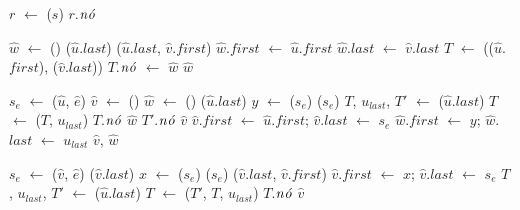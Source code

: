 \begin{algorithm}[htb]
\caption{\LCOFindNode($s$)}
\label{Algo:LCOFindNode}
\begin{algorithmic}[1]
\State $r$ $\gets$ \treapGetRoot($s$)
\State \Return $r$.$\mathit{n\acute{o}}$
\end{algorithmic}
\end{algorithm}


\begin{algorithm}[htb]
\caption{\LCOMerge($\hat u$, $\hat v$)}
\label{Algo:LCOMerge}
\begin{algorithmic}[1]
\State $\hat w$ $\gets$ \LCOMakeNode()
\State \linkcutEvert($\hat u$.$last$)
\State \linkcutAddEdge($\hat u$.$last$, $\hat v$.$first$)
\State $\hat w$.$first$  $\gets$ $\hat u$.$first$
\State $\hat w$.$last$  $\gets$ $\hat v$.$last$
\State $T$ $\gets$ \treapJoin(\treapGetRoot($\hat u$.$first$), \treapGetRoot($\hat v$.$last$))
\State $T$.$\mathit{n\acute{o}}$ $\gets$ $\hat w$
\State \Return $\hat w$
\end{algorithmic}
\end{algorithm}


\begin{algorithm}[htb]
\caption{\LCOSplit($\hat u$, $\hat e$)}
\label{Algo:LCOSplit}
\begin{algorithmic}[1]
\State $s_e$ $\gets$ \LCOFindSubNode($\hat u$, $\hat e$)
\State $\hat v$ $\gets$ \LCOMakeNode()
\State $\hat w$ $\gets$ \LCOMakeNode()
\State \linkcutEvert($\hat u$.$last$)
\State $y$ $\gets$ \linkcutParent($s_e$)
\State \linkcutDelEdge($s_e$)
\State $T$, $u_{last}$, $T'$ $\gets$ \treapSplit($\hat u$.$last$)
\State $T$ $\gets$ \treapJoin($T$, $u_{last}$)
\State $T$.$\mathit{n\acute{o}}$ $\hat w$
\State $T'$.$\mathit{n\acute{o}}$ $\hat v$
\State $\hat v$.$first$ $\gets$ $\hat u$.$first$; $\hat v$.$last$ $\gets$ $s_e$
\State $\hat w$.$first$ $\gets$ $y$; $\hat w$.$last$ $\gets$ $u_{last}$
\State \Return $\hat v$, $\hat w$
\end{algorithmic}
\end{algorithm}


\begin{algorithm}[htb]
\caption{\LCOCycle($\hat v$, $\hat e$)}
\label{Algo:LCOCycle}
\begin{algorithmic}[1]
\State $s_e$ $\gets$ \LCOFindSubNode($\hat v$, $\hat e$)
\State \linkcutEvert($\hat v$.$last$)
\State\Return
\EndIf
\State $x$ $\gets$ \linkcutParent($s_e$)
\State \linkcutDelEdge($s_e$)
\State \linkcutAddEdge($\hat v$.$last$, $\hat v$.$first$)
\State $\hat v$.$first$ $\gets$ $x$; $\hat v$.$last$ $\gets$ $s_e$
\State $T$, $u_{last}$, $T'$ $\gets$ \treapSplit($\hat u$.$last$)
\State $T$ $\gets$ \treapJoin($T'$, $T$, $u_{last}$)
\State $T$.$\mathit{n\acute{o}}$ $\hat v$
\end{algorithmic}
\end{algorithm}


